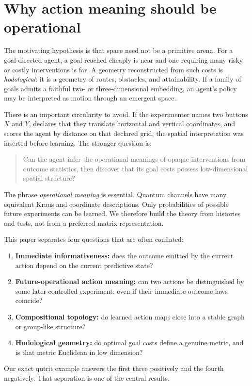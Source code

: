 \documentclass[11pt]{article}
\theoremstyle{definition}
\theoremstyle{remark}
\begin{document}
\section{Why action meaning should be operational}

The motivating hypothesis is that space need not be a primitive arena. For a
goal-directed agent, a goal reached cheaply is near and one requiring many
risky or costly interventions is far. A geometry reconstructed from such
costs is \emph{hodological}: it is a geometry of routes, obstacles, and
attainability. If a family of goals admits a faithful two- or
three-dimensional embedding, an agent's policy may be interpreted as motion
through an emergent space.

There is an important circularity to avoid. If the experimenter names two
buttons \(X\) and \(Y\), declares that they translate horizontal and vertical
coordinates, and scores the agent by distance on that declared grid, the
spatial interpretation was inserted before learning. The stronger question is:
\begin{quote}
Can the agent infer the operational meanings of opaque interventions from
outcome statistics, then discover that its goal costs possess low-dimensional
spatial structure?
\end{quote}
The phrase \emph{operational meaning} is essential. Quantum channels have many
equivalent Kraus and coordinate descriptions. Only probabilities of possible
future experiments can be learned. We therefore build the theory from
histories and tests, not from a preferred matrix representation.

This paper separates four questions that are often conflated:
\begin{enumerate}
\item \textbf{Immediate informativeness:} does the outcome emitted by the
current action depend on the current predictive state?
\item \textbf{Future-operational action meaning:} can two actions be
distinguished by some later controlled experiment, even if their immediate
outcome laws coincide?
\item \textbf{Compositional topology:} do learned action maps close into a
stable graph or group-like structure?
\item \textbf{Hodological geometry:} do optimal goal costs define a genuine
metric, and is that metric Euclidean in low dimension?
\end{enumerate}
Our exact qutrit example answers the first three positively and the fourth
negatively. That separation is one of the central results.
\end{document}
